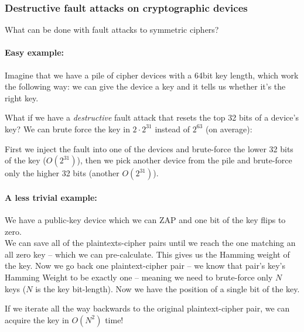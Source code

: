 \subsubsection*{Destructive fault attacks on cryptographic devices}\label{subsubsec:destructive_fault_attacks_on_cryptographic_devices}
What can be done with fault attacks to symmetric ciphers? \paragraph{Easy
example:} Imagine that we have a pile of cipher devices with a 64bit key length,
which work the following way: we can give the device a key and it tells us
whether it's the right key.

What if we have a \emph{destructive} fault attack that resets the top 32 bits of a
device's key? We can brute force the key in \(2\cdot 2^{31}\) instead of
\(2^{63}\) (on average):

First we inject the fault into one of the devices and brute-force the lower 32
bits of the key (\(O(2^{31})\)), then we pick another device from the pile and
brute-force only the higher 32 bits (another \(O(2^{31})\)).

\paragraph{A less trivial example:} We have a public-key device which we can ZAP
and one bit of the key flips to zero. \\
We can save all of the plaintexts-cipher pairs until we reach the one matching
an all zero key -- which we can pre-calculate. This gives us the Hamming weight
of the key. Now we go back one plaintext-cipher pair -- we know that pair's
key's Hamming Weight to be exactly one -- meaning we need to brute-force only
\(N\) keys (\(N\) is the key bit-length). Now we have the position of a single
bit of the key.

If we iterate all the way backwards to the original plaintext-cipher pair, we
can acquire the key in \(O(N^2)\) time!

